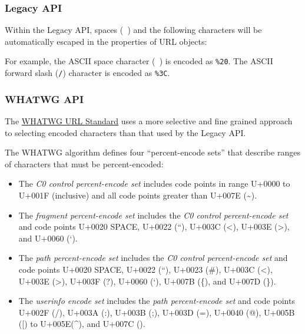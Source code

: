 \subsubsection{Legacy API}\label{legacy-api}

Within the Legacy API, spaces
(\texttt{\textquotesingle{}\ \textquotesingle{}}) and the following
characters will be automatically escaped in the properties of URL
objects:

\begin{Shaded}
\begin{Highlighting}[]
\end{Highlighting}
\end{Shaded}

For example, the ASCII space character
(\texttt{\textquotesingle{}\ \textquotesingle{}}) is encoded as
\texttt{\%20}. The ASCII forward slash (\texttt{/}) character is encoded
as \texttt{\%3C}.

\subsubsection{WHATWG API}\label{whatwg-api}

The \href{https://url.spec.whatwg.org/}{WHATWG URL Standard} uses a more
selective and fine grained approach to selecting encoded characters than
that used by the Legacy API.

The WHATWG algorithm defines four ``percent-encode sets'' that describe
ranges of characters that must be percent-encoded:

\begin{itemize}
\item
  The \emph{C0 control percent-encode set} includes code points in range
  U+0000 to U+001F (inclusive) and all code points greater than U+007E
  (\textasciitilde).
\item
  The \emph{fragment percent-encode set} includes the \emph{C0 control
  percent-encode set} and code points U+0020 SPACE, U+0022 (``), U+003C
  (\textless), U+003E (\textgreater), and U+0060 (`).
\item
  The \emph{path percent-encode set} includes the \emph{C0 control
  percent-encode set} and code points U+0020 SPACE, U+0022 (``), U+0023
  (\#), U+003C (\textless), U+003E (\textgreater), U+003F (?), U+0060
  (`), U+007B (\{), and U+007D (\}).
\item
  The \emph{userinfo encode set} includes the \emph{path percent-encode
  set} and code points U+002F (/), U+003A (:), U+003B (;), U+003D (=),
  U+0040 (@), U+005B ({[}) to U+005E(\^{}), and U+007C (\textbar).
\end{itemize}


